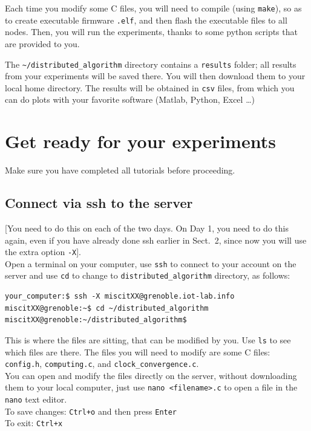 \documentclass[oneside]{article}
\begin{document}
Each time you modify some C files, you will need to compile (using \verb=make=), so as to create executable firmware \verb=.elf=, and then flash the executable files to all nodes. Then, you will run the experiments, thanks to some python scripts that are provided to you.

The \verb=~/distributed_algorithm= directory contains a \verb=results= folder; all results from your experiments will be saved there. You will then download them to your local home directory.
The results will be obtained in  \verb=csv= files, from which you can do plots with your favorite software (Matlab, Python, Excel \dots)


\newpage

\section{Get ready for your experiments}
Make sure you have completed all tutorials before proceeding.

\subsection{Connect via ssh to the server}  \label{sec:ssh}
[You need to do this on each of the two days. On Day 1, you need to do this again, even if you have already done ssh earlier in Sect.~2, since now you will use the extra option \verb"-X"].\\

Open a terminal on  your computer, use \verb=ssh= to connect to your account on the server and use \verb=cd= to change to \verb=distributed_algorithm= directory, as follows:
\begin{verbatim}your_computer:$ ssh -X miscitXX@grenoble.iot-lab.info
miscitXX@grenoble:~$ cd ~/distributed_algorithm
miscitXX@grenoble:~/distributed_algorithm$
\end{verbatim}
This is where the files are sitting, that can be modified by you.
Use \verb=ls= to see which files are there. 
The files you will need to modify are some C files: \verb=config.h=, \verb=computing.c=, and \verb=clock_convergence.c=.\\

You can open and modify the files directly on the server, without downloading
them to your local computer, just use \verb=nano <filename>.c= to open a file in
the \verb=nano= text editor. \\[2mm]
To save changes: \verb=Ctrl+o= and then press \verb=Enter= \\
To exit: \verb=Ctrl+x=\\
\end{document}

